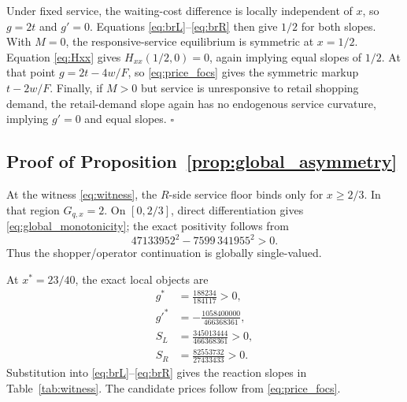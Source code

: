 Under fixed service, the waiting-cost difference is locally independent of $x$, so $g=2t$ and $g'=0$. Equations \eqref{eq:brL}--\eqref{eq:brR} then give $1/2$ for both slopes. With $M=0$, the responsive-service equilibrium is symmetric at $x=1/2$. Equation \eqref{eq:Hxx} gives $H_{xx}(1/2,0)=0$, again implying equal slopes of $1/2$. At that point $g=2t-4w/F$, so \eqref{eq:price_focs} gives the symmetric markup $t-2w/F$. Finally, if $M>0$ but service is unresponsive to retail shopping demand, the retail-demand slope again has no endogenous service curvature, implying $g'=0$ and equal slopes. \hfill$\square$

\subsection{Proof of Proposition~\ref{prop:global_asymmetry}}

At the witness \eqref{eq:witness}, the $R$-side service floor binds only for $x\geq2/3$. In that region $G_{q,x}=2$. On $[0,2/3]$, direct differentiation gives \eqref{eq:global_monotonicity}; the exact positivity follows from
\begin{equation}
47133952^2-7599\,341955^2>0.
\end{equation}
Thus the shopper/operator continuation is globally single-valued.

At $x^*=23/40$, the exact local objects are
\begin{align}
g^*&=\frac{188234}{184117}>0,\\
g'^*&=-\frac{1058400000}{466368361},\\
S_L&=\frac{345013444}{466368361}>0,\\
S_R&=\frac{82553732}{27433433}>0.
\end{align}
Substitution into \eqref{eq:brL}--\eqref{eq:brR} gives the reaction slopes in Table~\ref{tab:witness}. The candidate prices follow from \eqref{eq:price_focs}.

